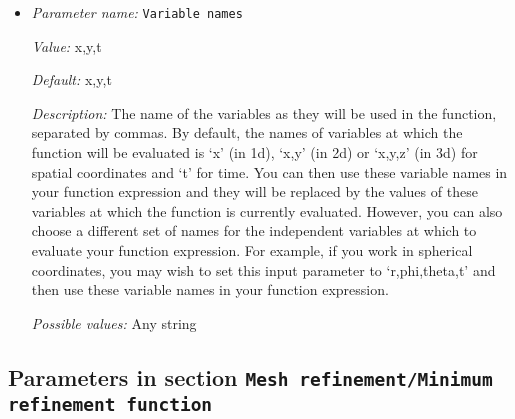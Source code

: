 \begin{itemize}
{\it Description:} The formula that denotes the function you want to evaluate for particular values of the independent variables. This expression may contain any of the usual operations such as addition or multiplication, as well as all of the common functions such as `sin' or `cos'. In addition, it may contain expressions like `if(x>0, 1, -1)' where the expression evaluates to the second argument if the first argument is true, and to the third argument otherwise. For a full overview of possible expressions accepted see the documentation of the muparser library at http://muparser.beltoforion.de/.

If the function you are describing represents a vector-valued function with multiple components, then separate the expressions for individual components by a semicolon.


{\it Possible values:} Any string
\item {\it Parameter name:} {\tt Variable names}
\label{parameters:Mesh refinement/Maximum refinement function/Variable names}


{\it Value:} x,y,t


{\it Default:} x,y,t


{\it Description:} The name of the variables as they will be used in the function, separated by commas. By default, the names of variables at which the function will be evaluated is `x' (in 1d), `x,y' (in 2d) or `x,y,z' (in 3d) for spatial coordinates and `t' for time. You can then use these variable names in your function expression and they will be replaced by the values of these variables at which the function is currently evaluated. However, you can also choose a different set of names for the independent variables at which to evaluate your function expression. For example, if you work in spherical coordinates, you may wish to set this input parameter to `r,phi,theta,t' and then use these variable names in your function expression.


{\it Possible values:} Any string
\end{itemize}

\subsection{Parameters in section \tt Mesh refinement/Minimum refinement function}
\label{parameters:Mesh_20refinement/Minimum_20refinement_20function}


